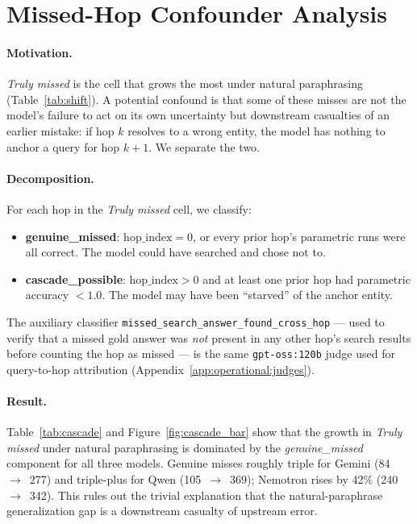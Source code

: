 \documentclass[10pt,letterpaper]{article}
\begin{document}
\section{Missed-Hop Confounder Analysis}\label{app:cascade}

\paragraph{Motivation.}
\emph{Truly missed} is the cell that grows the most under natural paraphrasing
(Table~\ref{tab:shift}). A potential confound is that some of these misses are not the
model's failure to act on its own uncertainty but downstream casualties of an earlier
mistake: if hop $k$ resolves to a wrong entity, the model has nothing to anchor a query
for hop $k{+}1$. We separate the two.

\paragraph{Decomposition.}
For each hop in the \emph{Truly missed} cell, we classify:
\begin{itemize}[leftmargin=*,itemsep=2pt]
\item \textbf{genuine\_missed}: $\text{hop\_index}=0$, or every prior hop's parametric
runs were all correct. The model could have searched and chose not to.
\item \textbf{cascade\_possible}: $\text{hop\_index}>0$ and at least one prior hop had
parametric accuracy $<1.0$. The model may have been ``starved'' of the anchor entity.
\end{itemize}
The auxiliary classifier \texttt{missed\_search\_answer\_found\_cross\_hop} ---
used to verify that a missed gold answer was \emph{not} present in any other hop's
search results before counting the hop as missed --- is the same
\texttt{gpt-oss:120b} judge used for query-to-hop attribution
(Appendix~\ref{app:operational:judges}).

\paragraph{Result.}
Table~\ref{tab:cascade} and Figure~\ref{fig:cascade_bar} show that the growth in
\emph{Truly missed} under natural paraphrasing is dominated by the
\emph{genuine\_missed} component for all three models. Genuine misses roughly triple for
Gemini (84~$\to$~277) and triple-plus for Qwen (105~$\to$~369); Nemotron rises by 42\%
(240~$\to$~342). This rules out the trivial explanation that the natural-paraphrase
generalization gap is a downstream casualty of upstream error.
\end{document}
